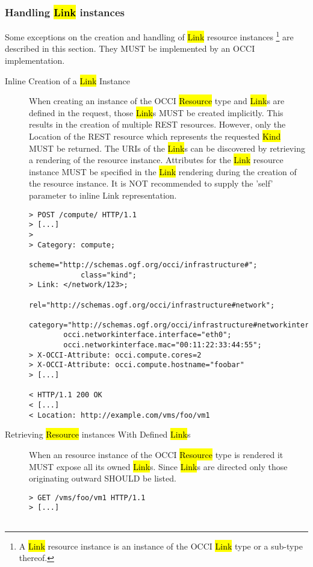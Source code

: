\documentclass[10pt,a4paper]{article}
\begin{document}
\subsubsection{Handling \hl{Link} instances}
Some exceptions on the creation and handling of \hl{Link} resource instances%
\footnote{A \hl{Link} resource instance is an instance of the OCCI \hl{Link}
type or a sub-type thereof.}
are described in this section. They MUST be implemented by an OCCI
implementation.

\begin{description}
  \item[Inline Creation of a \hl{Link} Instance] When creating an
    instance of the OCCI \hl{Resource} type and \hl{Link}s are defined
    in the request, those \hl{Link}s MUST be created implicitly. This
    results in the creation of multiple REST resources. However, only
    the Location of the REST resource which represents the requested
    \hl{Kind} MUST be returned. The URIs of the \hl{Link}s can be
    discovered by retrieving a rendering of the resource
    instance. Attributes for the \hl{Link} resource instance MUST be
    specified in the \hl{Link} rendering during the creation of the
    resource instance. It is NOT recommended to supply the 'self'
    parameter to inline Link representation.

\begin{verbatim}
> POST /compute/ HTTP/1.1
> [...]
> 
> Category: compute; 
            scheme="http://schemas.ogf.org/occi/infrastructure#"; 
            class="kind"; 
> Link: </network/123>;
        rel="http://schemas.ogf.org/occi/infrastructure#network";
        category="http://schemas.ogf.org/occi/infrastructure#networkinterface";
        occi.networkinterface.interface="eth0";
        occi.networkinterface.mac="00:11:22:33:44:55";
> X-OCCI-Attribute: occi.compute.cores=2
> X-OCCI-Attribute: occi.compute.hostname="foobar"
> [...]
 
< HTTP/1.1 200 OK
< [...]
< Location: http://example.com/vms/foo/vm1
\end{verbatim}

  \item[Retrieving \hl{Resource} instances With Defined \hl{Link}s]
    When an resource instance of the OCCI \hl{Resource} type is
    rendered it MUST expose all its owned \hl{Link}s. Since \hl{Link}s
    are directed only those originating outward SHOULD be listed.

\begin{verbatim}
> GET /vms/foo/vm1 HTTP/1.1
> [...]
 

\end{verbatim}
\end{description}
\end{document}
